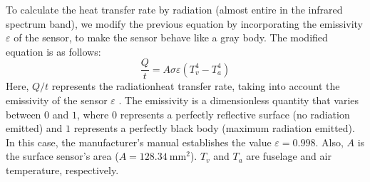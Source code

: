 \documentclass[english]{cenarticle} %
\begin{document}
%
To calculate the heat transfer rate by radiation (almost entire in the infrared spectrum band), we modify the previous equation by incorporating the emissivity $\varepsilon$ of the sensor, to make the sensor behave like a gray body. The modified equation is as follows:
%
\vspace{-1mm}
\begin{equation}
  \frac{Q}{t}=A\sigma\varepsilon (T_{v}^{4} - T_{a}^{4})
\end{equation}
%
Here, $Q \slash t$ represents the radiationheat transfer rate, taking into account the emissivity of the sensor $\varepsilon$ . The emissivity is a dimensionless quantity that varies between $0$ and $1$, where $0$ represents a perfectly reflective surface (no radiation emitted) and $1$ represents a perfectly black body (maximum radiation emitted). In this case, the manufacturer's manual establishes the value $\varepsilon = 0.998$. Also, $A$ is the surface sensor's area ($A=\SI{128.34}{\milli\meter^2}$). $T_v$ and $T_a$ are fuselage and air temperature, respectively.
%
\end{document}
